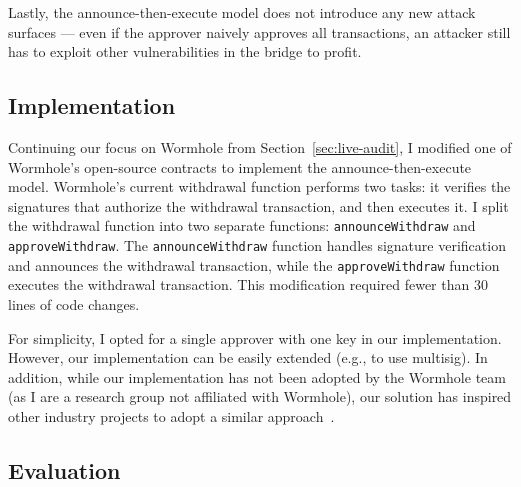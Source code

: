 Lastly, the announce-then-execute model does not
introduce any new attack surfaces --- even if the approver naively
approves all transactions, an attacker still has to exploit other
vulnerabilities in the bridge to profit.

\subsection{Implementation}


Continuing our focus on Wormhole from Section~\ref{sec:live-audit}, I
modified one of Wormhole's open-source contracts to implement the
announce-then-execute model.  Wormhole's current withdrawal function
performs two tasks: it verifies the signatures that authorize the
withdrawal transaction, and then executes it. I
split the withdrawal function into two separate functions:
\texttt{announceWithdraw} and \texttt{approveWithdraw}. The
\texttt{announceWithdraw} function handles signature verification and
announces the withdrawal transaction,
while the \texttt{approveWithdraw} function executes the withdrawal
transaction. This modification required fewer than 30 lines of code
changes.

For simplicity, I opted for a single approver with one key in our implementation. However, our implementation can be easily extended (e.g., to use multisig). In addition, while our implementation has not been adopted by the Wormhole team (as I are a research group not affiliated with Wormhole), our solution has inspired other industry projects to adopt a similar approach~\cite{bascule}.

\subsection{Evaluation}

